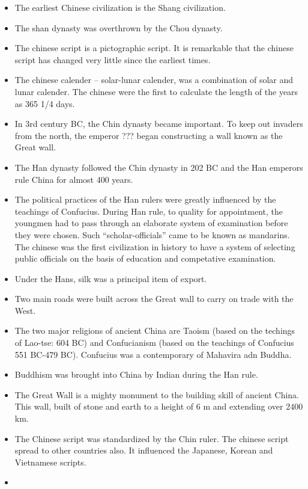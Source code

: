 \documentclass[
  openany]{book}
\providecommand{\tightlist}{%
  \setlength{\itemsep}{0pt}\setlength{\parskip}{0pt}}
\begin{document}
\begin{itemize}
\tightlist
\item
  The earliest Chinese civilization is the Shang civilization.
\item
  The shan dynasty was overthrown by the Chou dynasty.
\item
  The chinese script is a pictographic script. It is remarkable that the chinese script has changed very little since the earliest times.
\item
  The chinese calender -- solar-lunar calender, was a combination of solar and lunar calender. The chinese were the first to calculate the length of the years as 365 1/4 days.
\item
  In 3rd century BC, the Chin dynasty became important. To keep out invaders from the north, the emperor ??? began constructing a wall known as the Great wall.
\item
  The Han dynasty followed the Chin dynasty in 202 BC and the Han emperors rule China for almost 400 years.
\item
  The political practices of the Han rulers were greatly influenced by the teachings of Confucius. During Han rule, to quality for appointment, the youngmen had to pass through an elaborate system of examination before they were chosen. Such ``scholar-officials'' came to be known as mandarins. The chinese was the first civilization in history to have a system of selecting public officials on the basis of education and competative examination.
\item
  Under the Hans, silk was a principal item of export.
\item
  Two main roads were built across the Great wall to carry on trade with the West.
\item
  The two major religions of ancient China are Taoism (based on the techings of Lao-tse: 604 BC) and Confucianism (based on the teachings of Confucius 551 BC-479 BC). Confucius was a contemporary of Mahavira adn Buddha.
\item
  Buddhism was brought into China by Indian during the Han rule.
\item
  The Great Wall is a mighty monument to the building skill of ancient China. This wall, built of stone and earth to a height of 6 m and extending over 2400 km.
\item
  The Chinese script was standardized by the Chin ruler. The chinese script spread to other countries also. It influenced the Japanese, Korean and Vietnamese scripts.
\item

\end{itemize}
\end{document}
